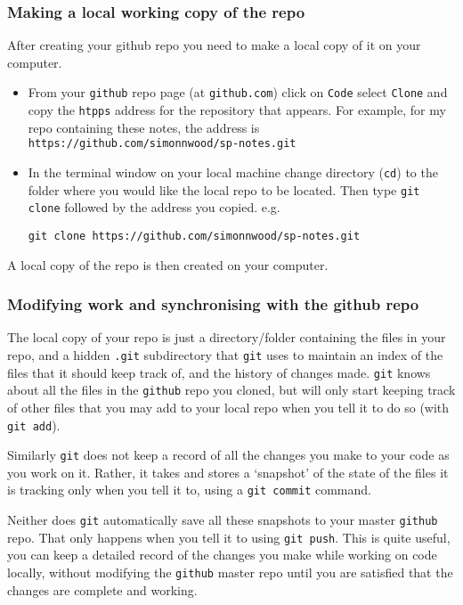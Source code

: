 \documentclass[10pt] {article}
\theoremstyle{definition}
\begin{document}
\subsubsection{Making a local working copy of the repo}

After creating your github repo you need to make a local copy of it on your computer. 
\begin{itemize}
\item From your {\tt github} repo page (at {\tt github.com}) click on {\tt Code} select {\tt Clone} and copy the {\tt htpps} address for the repository that appears. For example, for my repo containing these notes, the address is \verb+https://github.com/simonnwood/sp-notes.git+
\item In the terminal window on your local machine change directory ({\tt cd}) to the folder where you would like the local repo to be located. Then type {\tt git clone} followed by the address you copied. e.g. 
\begin{verbatim}
git clone https://github.com/simonnwood/sp-notes.git
\end{verbatim}
\end{itemize}
A local copy of the repo is then created on your computer. 

\subsubsection{Modifying work and synchronising with the github repo}

The local copy of your repo is just a directory/folder containing the files in your repo, and a hidden {\tt .git} subdirectory that {\tt git} uses to maintain an index of the files that it should keep track of, and the history of changes made. {\tt git} knows about all the files in the {\tt github} repo you cloned, but will only start keeping track of other files that you may add to your local repo when you tell it to do so (with \verb+git add+). 

Similarly {\tt git} does not keep a record of all the changes you make to your code as you work on it. Rather, it takes and stores a `snapshot' of the state of the files it is tracking only when you tell it to, using a {\tt git commit} command. 

Neither does {\tt git} automatically save all these snapshots to your master {\tt github} repo. That only happens when you tell it to using {\tt git push}. This is quite useful, you can keep a detailed record of the changes you make while working on code locally, without modifying the {\tt github} master repo until you are satisfied that the changes are complete and working.   
\end{document}

